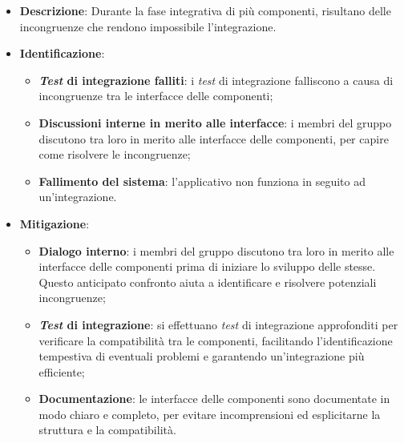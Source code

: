 \label{risk:interfacce incoerenti}
\begin{itemize}
	\item \textbf{Descrizione}:
	      Durante la fase integrativa di più componenti, risultano delle
	      incongruenze che rendono impossibile l'integrazione.
	\item \textbf{Identificazione}:
	      \begin{itemize}
		      \item \textbf{\textit{Test} di integrazione falliti}: i \textit{test} di
		            integrazione falliscono a causa di incongruenze tra le
		            interfacce delle componenti;

		      \item \textbf{Discussioni interne in merito alle interfacce}: i
		            membri del gruppo discutono tra loro in merito alle
		            interfacce delle componenti, per capire come risolvere le
		            incongruenze;

		      \item \textbf{Fallimento del sistema}: l'applicativo non funziona
		            in seguito ad un'integrazione.

	      \end{itemize}
	\item \textbf{Mitigazione}:
	      \begin{itemize}
		      \item \textbf{Dialogo interno}: i membri del gruppo discutono tra loro
		            in merito alle interfacce delle componenti prima di iniziare lo 
					sviluppo delle stesse. Questo anticipato confronto aiuta a identificare 
					e risolvere potenziali incongruenze;

		      \item \textbf{\textit{Test} di integrazione}: si effettuano \textit{test} di integrazione 
			  		approfonditi per verificare la compatibilità tra le componenti, facilitando 
			  		l'identificazione tempestiva di eventuali problemi e garantendo 
			  		un'integrazione più efficiente;

		      \item \textbf{Documentazione}: le interfacce delle componenti sono
		            documentate in modo chiaro e completo, per evitare
		            incomprensioni ed esplicitarne la struttura e la
		            compatibilità.
	      \end{itemize}
\end{itemize}
